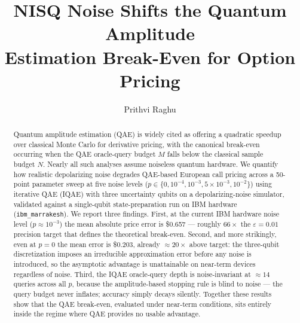 \documentclass[runningheads]{llncs}
\begin{document}
\title{NISQ Noise Shifts the Quantum Amplitude\\ Estimation Break-Even for Option Pricing}


\author{Prithvi Raghu}


\maketitle

\begin{abstract}
Quantum amplitude estimation (QAE) is widely cited as offering a quadratic
speedup over classical Monte Carlo for derivative pricing, with the canonical
break-even occurring when the QAE oracle-query budget $M$ falls below the
classical sample budget $N$. Nearly all such analyses assume noiseless quantum
hardware. We quantify how realistic depolarizing noise degrades QAE-based
European call pricing across a 50-point parameter sweep at five noise levels
($p \in \{0, 10^{-4}, 10^{-3}, 5\times10^{-3}, 10^{-2}\}$) using iterative QAE
(IQAE) with three uncertainty qubits on a depolarizing-noise simulator,
validated against a single-qubit state-preparation run on IBM hardware
(\texttt{ibm\_marrakesh}). We report three findings. First, at the current IBM
hardware noise level ($p \approx 10^{-3}$) the mean absolute price error is
\$0.657 --- roughly $66\times$ the $\varepsilon = 0.01$ precision target that
defines the theoretical break-even. Second, and more strikingly, even at
$p = 0$ the mean error is \$0.203, already ${\approx}20\times$ above target:
the three-qubit discretization imposes an irreducible approximation error
before any noise is introduced, so the asymptotic advantage is unattainable on
near-term devices regardless of noise. Third, the IQAE oracle-query depth is
noise-invariant at ${\approx}14$ queries across all $p$, because the
amplitude-based stopping rule is blind to noise --- the query budget never
inflates; accuracy simply decays silently. Together these results show that the
QAE break-even, evaluated under near-term conditions, sits entirely inside the
regime where QAE provides no usable advantage.

\end{abstract}
\end{document}
